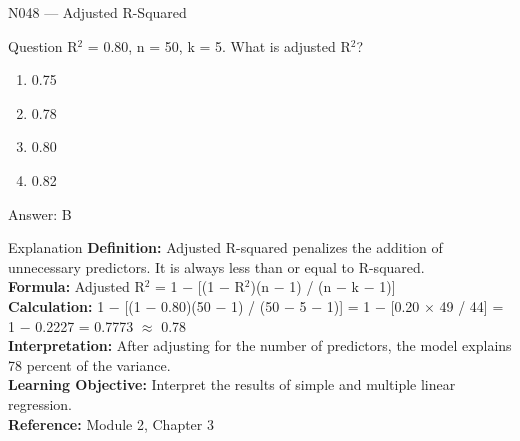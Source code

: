 \documentclass[aspectratio=169,8pt]{beamer}
\begin{document}
	\begin{frame}{N048 --- Adjusted R-Squared}
		\begin{block}{Question}
			R$^{2}$ = 0.80, n = 50, k = 5. What is adjusted R$^{2}$?
			\begin{enumerate}
				\item 0.75
				\item 0.78
				\item 0.80
				\item 0.82
			\end{enumerate}
		\end{block}
		\begin{exampleblock}{Answer: B}\end{exampleblock}
		\begin{block}{Explanation}
			\textbf{Definition:} Adjusted R-squared penalizes the addition of unnecessary predictors. It is always less than or equal to R-squared.\\
			\textbf{Formula:} Adjusted R$^{2}$ = 1 $-$ [(1 $-$ R$^{2}$)(n $-$ 1) / (n $-$ k $-$ 1)]\\
			\textbf{Calculation:} 1 $-$ [(1 $-$ 0.80)(50 $-$ 1) / (50 $-$ 5 $-$ 1)] = 1 $-$ [0.20 $\times$ 49 / 44] = 1 $-$ 0.2227 = 0.7773 $\approx$ 0.78\\
			\textbf{Interpretation:} After adjusting for the number of predictors, the model explains 78 percent of the variance.\\
			\textbf{Learning Objective:} Interpret the results of simple and multiple linear regression.\\
			\textbf{Reference:} Module 2, Chapter 3
		\end{block}
	\end{frame}
	
\end{document}
